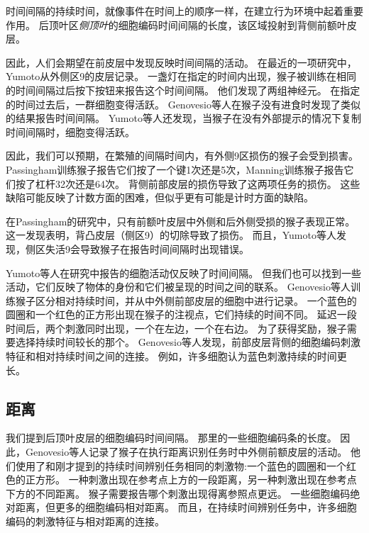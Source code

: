 时间间隔的持续时间，就像事件在时间上的顺序一样，在建立行为环境中起着重要作用。
后顶叶区\textit{侧顶叶}的细胞编码时间间隔的长度\cite{leon2003representation}，该区域投射到背侧前额叶皮层。


因此，人们会期望在前皮层中发现反映时间间隔的活动。
在最近的一项研究中，Yumoto\cite{yumoto2011neural}从外侧区9的皮层记录。
一盏灯在指定的时间内出现，猴子被训练在相同的时间间隔过后按下按钮来报告这个时间间隔。
他们发现了两组神经元。
在指定的时间过去后，一群细胞变得活跃。
Genovesio等人\cite{genovesio2006neuronal}在猴子没有进食时发现了类似的结果报告时间间隔。
Yumoto等人还发现，当猴子在没有外部提示的情况下复制时间间隔时，细胞变得活跃。


因此，我们可以预期，在繁殖的间隔时间内，有外侧9区损伤的猴子会受到损害。
Passingham\cite{passingham1978information}训练猴子报告它们按了一个键1次还是5次，Manning\cite{manning1978dorsolateral}训练猴子报告它们按了杠杆32次还是64次。
背侧前部皮层的损伤导致了这两项任务的损伤。
这些缺陷可能反映了计数方面的困难，但似乎更有可能是计时方面的缺陷。


在Passingham\cite{passingham1978information}的研究中，只有前额叶皮层中外侧和后外侧受损的猴子表现正常。
这一发现表明，背凸皮层（侧区9）的切除导致了损伤。
而且，Yumoto等人\cite{yumoto2011neural}发现，侧区失活9会导致猴子在报告时间间隔时出现错误。


Yumoto等人在研究中报告的细胞活动仅反映了时间间隔。
但我们也可以找到一些活动，它们反映了物体的身份和它们被呈现的时间之间的联系。
Genovesio等人\cite{genovesio2009feature}训练猴子区分相对持续时间，并从中外侧前部皮层的细胞中进行记录。
一个蓝色的圆圈和一个红色的正方形出现在猴子的注视点，它们持续的时间不同。
延迟一段时间后，两个刺激同时出现，一个在左边，一个在右边。
为了获得奖励，猴子需要选择持续时间较长的那个。
Genovesio等人发现，前部皮层背侧的细胞编码刺激特征和相对持续时间之间的连接。
例如，许多细胞认为蓝色刺激持续的时间更长。


\subsection{距离}

我们提到后顶叶皮层的细胞编码时间间隔\cite{leon2003representation}。
那里的一些细胞编码条的长度\cite{tudusciuc2007neuronal}。
因此，Genovesio等人\cite{genovesio2011prefrontal}记录了猴子在执行距离识别任务时中外侧前额皮层的活动。
他们使用了和刚才提到的持续时间辨别任务相同的刺激物:一个蓝色的圆圈和一个红色的正方形。
一种刺激出现在参考点上方的一段距离，另一种刺激出现在参考点下方的不同距离。
猴子需要报告哪个刺激出现得离参照点更远。
一些细胞编码绝对距离，但更多的细胞编码相对距离。
而且，在持续时间辨别任务中，许多细胞编码的刺激特征与相对距离的连接。


